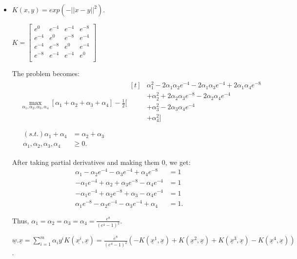 \documentclass[letter, 12pt]{article}
\begin{document}
\begin{enumerate}
\begin{itemize}
    		\item{$ K(x, y) = exp(-||x - y||^2 ). $}
    		\par{}
    		$ K = \begin{bmatrix}
    		e^{0} & e^{-4} & e^{-4} & e^{-8} \\
    		e^{-4} & e^{0} & e^{-8} & e^{-4} \\
    		e^{-4} & e^{-8} & e^{0} & e^{-4} \\
    		e^{-8} & e^{-4} & e^{-4} & e^{0} \\
    		\end{bmatrix} $
    		\par{The problem becomes:}
    		\begin{align*}
    		&\max_{\alpha_1, \alpha_2, \alpha_3, \alpha_4} [\alpha_1 + \alpha_2 + \alpha_3 + \alpha_4] - \frac{1}{2} [
    		\begin{aligned}[t]
    		& \alpha_1^2 - 2\alpha_1 \alpha_2 e^{-4} - 2\alpha_1 \alpha_3 e^{-4} + 2\alpha_1 \alpha_4 e^{-8} \\
    		& +  \alpha_2^2 + 2\alpha_2 \alpha_3 e^{-8} - 2\alpha_2 \alpha_4 e^{-4} \\
    		& +  \alpha_3^2 - 2\alpha_3 \alpha_4 e^{-4} \\
    		& +  \alpha_4^2 ] \\
    		\end{aligned} \\
    		&
    		\begin{aligned}
    		(s.t.) \alpha_1 + \alpha_4 &= \alpha_2 + \alpha_3 \\
    		\alpha_1, \alpha_2, \alpha_3, \alpha_4 &\ge 0.
    		\end{aligned}
    		\end{align*}
    		\par{After taking partial derivatives and making them 0, we get:}
    		\begin{align*}
    		 \alpha_1 - \alpha_2 e^{-4} - \alpha_3 e^{-4} + \alpha_4 e^{-8} &= 1 \\
    		-\alpha_1 e^{-4} +  \alpha_2 + \alpha_3 e^{-8} - \alpha_4 e^{-4} &= 1 \\
    		- \alpha_1 e^{-4} + \alpha_2 e^{-8} +  \alpha_3 - \alpha_4 e^{-4} &= 1 \\
    		\alpha_1 e^{-8} - \alpha_2 e^{-4} - \alpha_3 e^{-4} +  \alpha_4 &= 1 .
    		\end{align*}
    		\par{Thus, $ \alpha_1 = \alpha_2 = \alpha_3 = \alpha_4 = \frac{e^8}{(e^4 - 1)^2} $.}
    		\par{$ \underline{w}.\underline{x} = \sum_{i=1}^m \alpha_i y^i K(\underline{x^i}, \underline{x}) =  \frac{e^8}{(e^4 - 1)^2}(-K(\underline{x}^1, \underline{x}) + K(\underline{x}^2, \underline{x}) + K(\underline{x}^3, \underline{x}) - K(\underline{x}^4, \underline{x}))$.}

\end{itemize}
\end{enumerate}
\end{document}
